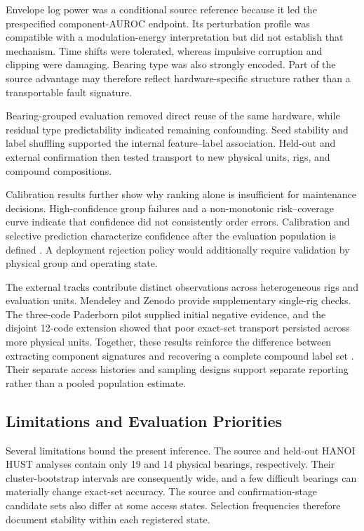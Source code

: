 \documentclass[machines,article,submit,oneauthor,pdftex]{Definitions/mdpi}
\begin{document}
Envelope log power was a conditional source reference because it led the prespecified component-AUROC endpoint. Its perturbation profile was compatible with a modulation-energy interpretation but did not establish that mechanism. Time shifts were tolerated, whereas impulsive corruption and clipping were damaging. Bearing type was also strongly encoded. Part of the source advantage may therefore reflect hardware-specific structure rather than a transportable fault signature.

Bearing-grouped evaluation removed direct reuse of the same hardware, while residual type predictability indicated remaining confounding. Seed stability and label shuffling supported the internal feature--label association. Held-out and external confirmation then tested transport to new physical units, rigs, and compound compositions.

Calibration results further show why ranking alone is insufficient for maintenance decisions. High-confidence group failures and a non-monotonic risk--coverage curve indicate that confidence did not consistently order errors. Calibration and selective prediction characterize confidence after the evaluation population is defined \cite{r29,r30,r31,r40}. A deployment rejection policy would additionally require validation by physical group and operating state.

The external tracks contribute distinct observations across heterogeneous rigs and evaluation units. Mendeley and Zenodo provide supplementary single-rig checks. The three-code Paderborn pilot supplied initial negative evidence, and the disjoint 12-code extension showed that poor exact-set transport persisted across more physical units. Together, these results reinforce the difference between extracting component signatures and recovering a complete compound label set \cite{r25,r26,r27,r28,r35}. Their separate access histories and sampling designs support separate reporting rather than a pooled population estimate.

\subsection{Limitations and Evaluation Priorities}

Several limitations bound the present inference. The source and held-out HANOI HUST analyses contain only 19 and 14 physical bearings, respectively. Their cluster-bootstrap intervals are consequently wide, and a few difficult bearings can materially change exact-set accuracy. The source and confirmation-stage candidate sets also differ at some access states. Selection frequencies therefore document stability within each registered state.
\end{document}
